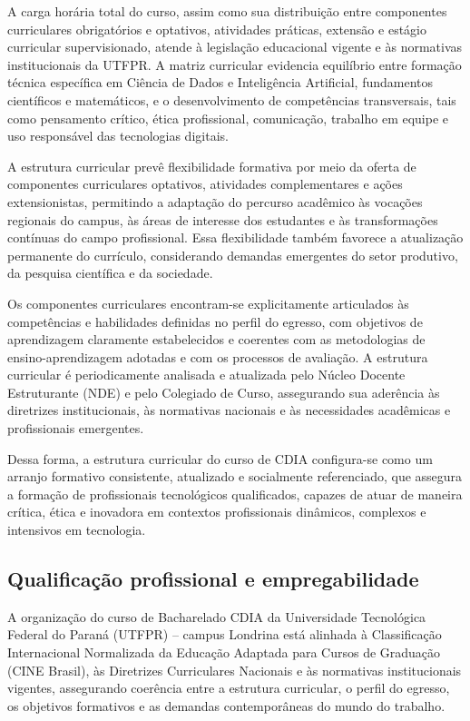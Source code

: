 A carga horária total do curso, assim como sua distribuição entre componentes curriculares obrigatórios e optativos, atividades práticas, extensão e estágio curricular supervisionado, atende à legislação educacional vigente e às normativas institucionais da UTFPR. A matriz curricular evidencia equilíbrio entre formação técnica específica em Ciência de Dados e Inteligência Artificial, fundamentos científicos e matemáticos, e o desenvolvimento de competências transversais, tais como pensamento crítico, ética profissional, comunicação, trabalho em equipe e uso responsável das tecnologias digitais.

A estrutura curricular prevê flexibilidade formativa por meio da oferta de componentes curriculares optativos, atividades complementares e ações extensionistas, permitindo a adaptação do percurso acadêmico às vocações regionais do campus, às áreas de interesse dos estudantes e às transformações contínuas do campo profissional. Essa flexibilidade também favorece a atualização permanente do currículo, considerando demandas emergentes do setor produtivo, da pesquisa científica e da sociedade.

Os componentes curriculares encontram-se explicitamente articulados às competências e habilidades definidas no perfil do egresso, com objetivos de aprendizagem claramente estabelecidos e coerentes com as metodologias de ensino-aprendizagem adotadas e com os processos de avaliação. A estrutura curricular é periodicamente analisada e atualizada pelo Núcleo Docente Estruturante (NDE) e pelo Colegiado de Curso, assegurando sua aderência às diretrizes institucionais, às normativas nacionais e às necessidades acadêmicas e profissionais emergentes.

Dessa forma, a estrutura curricular do curso de CDIA configura-se como um arranjo formativo consistente, atualizado e socialmente referenciado, que assegura a formação de profissionais tecnológicos qualificados, capazes de atuar de maneira crítica, ética e inovadora em contextos profissionais dinâmicos, complexos e intensivos em tecnologia.

\subsection{Qualificação profissional e empregabilidade}

A organização do curso de Bacharelado CDIA da Universidade Tecnológica Federal do Paraná (UTFPR) – campus Londrina está alinhada à Classificação Internacional Normalizada da Educação Adaptada para Cursos de Graduação (CINE Brasil), às Diretrizes Curriculares Nacionais e às normativas institucionais vigentes, assegurando coerência entre a estrutura curricular, o perfil do egresso, os objetivos formativos e as demandas contemporâneas do mundo do trabalho.

